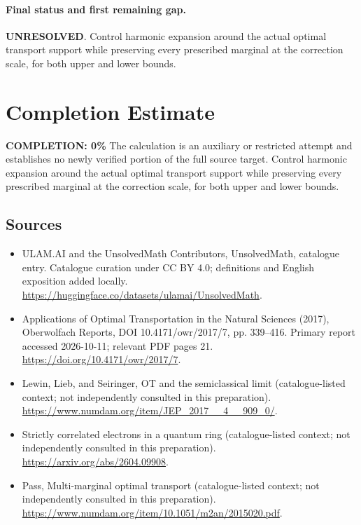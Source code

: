\documentclass[11pt]{article}
\begin{document}
\paragraph{Final status and first remaining gap.}
\textbf{UNRESOLVED}. Control harmonic expansion around the actual optimal transport support while preserving every prescribed marginal at the correction scale, for both upper and lower bounds.

\section{Completion Estimate}
\noindent\textbf{COMPLETION: 0\%}
The calculation is an auxiliary or restricted attempt and establishes no newly verified portion of the full source target. Control harmonic expansion around the actual optimal transport support while preserving every prescribed marginal at the correction scale, for both upper and lower bounds.

\subsection{Sources}
\begin{itemize}
\item[\hypertarget{source:statement:1}{S1}] ULAM.AI and the UnsolvedMath Contributors, UnsolvedMath, catalogue entry. Catalogue curation under CC BY 4.0; definitions and English exposition added locally.
\url{https://huggingface.co/datasets/ulamai/UnsolvedMath}.
\item[\hypertarget{source:statement:2}{S2}] Applications of Optimal Transportation in the Natural Sciences (2017), Oberwolfach Reports, DOI 10.4171/owr/2017/7, pp. 339--416. Primary report accessed 2026-10-11; relevant PDF pages 21.
\url{https://doi.org/10.4171/owr/2017/7}.
\item[\hypertarget{source:statement:3}{S3}] Lewin, Lieb, and Seiringer, OT and the semiclassical limit (catalogue-listed context; not independently consulted in this preparation).
\url{https://www.numdam.org/item/JEP_2017__4__909_0/}.
\item[\hypertarget{source:statement:4}{S4}] Strictly correlated electrons in a quantum ring (catalogue-listed context; not independently consulted in this preparation).
\url{https://arxiv.org/abs/2604.09908}.
\item[\hypertarget{source:statement:5}{S5}] Pass, Multi-marginal optimal transport (catalogue-listed context; not independently consulted in this preparation).
\url{https://www.numdam.org/item/10.1051/m2an/2015020.pdf}.
\end{itemize}
\label{end:statement}
\end{document}
